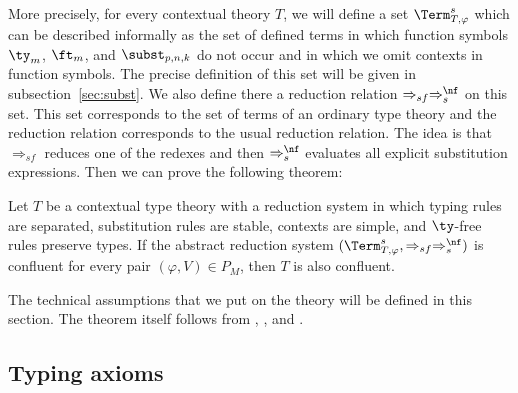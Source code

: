 More precisely, for every contextual theory $T$, we will define a set $\Term_{T,\varphi}^s$ which can be described informally as the set of defined terms
in which function symbols $\ty_m$, $\ft_m$, and $\subst_{p,n,k}$ do not occur and in which we omit contexts in function symbols.
The precise definition of this set will be given in subsection~\ref{sec:subst}.
We also define there a reduction relation $\Rightarrow_{sf} \Rightarrow_s^\nf$ on this set.
This set corresponds to the set of terms of an ordinary type theory and the reduction relation corresponds to the usual reduction relation.
The idea is that $\Rightarrow_{sf}$ reduces one of the redexes and then $\Rightarrow_s^\nf$ evaluates all explicit substitution expressions.
Then we can prove the following theorem:

\begin{thm}
Let $T$ be a contextual type theory with a reduction system in which typing rules are separated, substitution rules are stable, contexts are simple, and $\ty$-free rules preserve types.
If the abstract reduction system $(\Term_{T,\varphi}^s, \Rightarrow_{sf} \Rightarrow_s^\nf)$ is confluent for every pair $(\varphi,V) \in P_M$, then $T$ is also confluent.
\end{thm}

The technical assumptions that we put on the theory will be defined in this section.
The theorem itself follows from , , and .

\subsection{Typing axioms}

